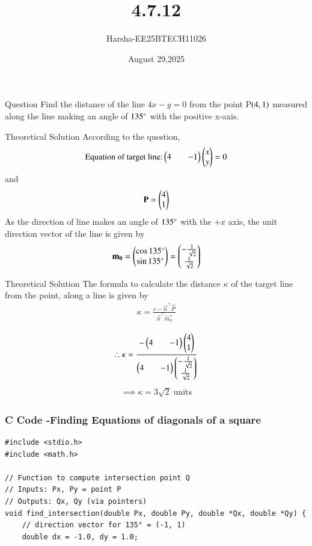 \documentclass{beamer}
\title %
{4.7.12}
\date{August 29,2025}
\author %
{Harsha-EE25BTECH11026}
\begin{document}
\frame{\titlepage}


\begin{frame}{Question}
Find the distance of the line $4x-y=0$ from the point P$\left(4,1\right)$ measured along the line making an angle of $135\degree$ with the positive x-axis.
\end{frame}

\begin{frame}{Theoretical Solution}
According to the question,\\
\begin{align}
    \text{Equation of target line:}\begin{pmatrix}4&&-1\end{pmatrix}\begin{pmatrix}x\\y\end{pmatrix}=0
\end{align}
and
\begin{align}
    \mathbf{P}=\begin{pmatrix}4\\1\end{pmatrix}
\end{align}
As the direction of line makes an angle of $135\degree$ with the $+x$ axis, the unit direction vector of the line is given by
\begin{align}
    \mathbf{m_0}=\begin{pmatrix}\cos{135\degree}\\\sin{135\degree}\end{pmatrix}=\begin{pmatrix}-\frac{1}{\sqrt{2}}\\\frac{1}{\sqrt{2}}\end{pmatrix}
\end{align}
\end{frame}


\begin{frame}{Theoretical Solution}
The formula to calculate the distance $\kappa$ of the target line from the point, along a line is given by
\begin{align}
    \kappa=\frac{c-\vec{n}^{\top}\vec{P}}{\vec{n}^{\top}\vec{m_0}}\\
\end{align}
\begin{align}
     \therefore \kappa=\frac{-\begin{pmatrix}4&&-1\end{pmatrix}\begin{pmatrix}4\\1\end{pmatrix}}{\begin{pmatrix}4&&-1\end{pmatrix}\begin{pmatrix}-\frac{1}{\sqrt{2}}\\\frac{1}{\sqrt{2}}\end{pmatrix}}
\end{align}
\begin{align}
    \implies \kappa=3\sqrt{2}\; \text{units}
\end{align}

\end{frame}



\begin{frame}[fragile]
    \frametitle{C Code -Finding Equations of diagonals of a square}

    \begin{lstlisting}
#include <stdio.h>
#include <math.h>

// Function to compute intersection point Q
// Inputs: Px, Py = point P
// Outputs: Qx, Qy (via pointers)
void find_intersection(double Px, double Py, double *Qx, double *Qy) {
    // direction vector for 135° = (-1, 1)
    double dx = -1.0, dy = 1.0;

    \end{lstlisting}
\end{frame}
\end{document}
